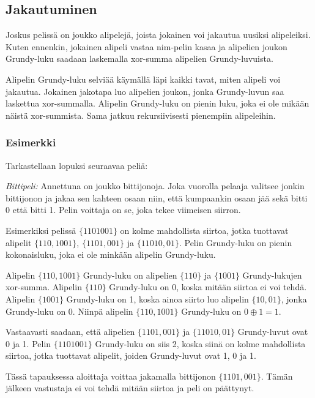 \subsection{Jakautuminen}

Joskus pelissä on joukko alipelejä,
joista jokainen voi jakautua uusiksi alipeleiksi.
Kuten ennenkin, jokainen alipeli vastaa
nim-pelin kasaa ja alipelien joukon Grundy-luku
saadaan laskemalla xor-summa alipelien Grundy-luvuista.

Alipelin Grundy-luku selviää käymällä
läpi kaikki tavat, miten alipeli voi jakautua.
Jokainen jakotapa luo alipelien joukon,
jonka Grundy-luvun saa laskettua xor-summalla.
Alipelin Grundy-luku on pienin luku,
joka ei ole mikään näistä xor-summista.
Sama jatkuu rekursiivisesti pienempiin alipeleihin.

\subsubsection*{Esimerkki}

Tarkastellaan lopuksi seuraavaa peliä:

\textit{Bittipeli:} Annettuna on joukko
bittijonoja. Joka vuorolla pelaaja valitsee
jonkin bittijonon ja jakaa sen kahteen
osaan niin, että kumpaankin osaan
jää sekä bitti 0 että bitti 1.
Pelin voittaja on se, joka tekee viimeisen siirron.

Esimerkiksi pelissä $\{1101001\}$
on kolme mahdollista siirtoa, jotka tuottavat
alipelit $\{110,1001\}$, $\{1101,001\}$ ja $\{11010,01\}$.
Pelin Grundy-luku on pienin kokonaisluku,
joka ei ole minkään alipelin Grundy-luku.

Alipelin $\{110,1001\}$ Grundy-luku on
alipelien $\{110\}$ ja $\{1001\}$ Grundy-lukujen
xor-summa. Alipelin $\{110\}$ Grundy-luku on 0,
koska mitään siirtoa ei voi tehdä.
Alipelin $\{1001\}$ Grundy-luku on 1,
koska ainoa siirto luo alipelin $\{10,01\}$,
jonka Grundy-luku on 0.
Niinpä alipelin $\{110,1001\}$ Grundy-luku on $0 \oplus 1 = 1$.

Vastaavasti saadaan, että
alipelien $\{1101,001\}$ ja $\{11010,01\}$
Grundy-luvut ovat 0 ja 1.
Pelin $\{1101001\}$ Grundy-luku on siis 2,
koska siinä on kolme mahdollista siirtoa,
jotka tuottavat alipelit, joiden Grundy-luvut
ovat 1, 0 ja 1.

Tässä tapauksessa aloittaja voittaa
jakamalla bittijonon $\{1101,001\}$. Tämän jälkeen vastustaja
ei voi tehdä mitään siirtoa ja peli on päättynyt.


